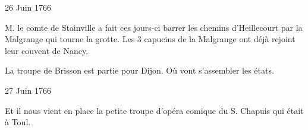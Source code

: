                      \begin{diary}{26 Juin 1766}{}
                        
                        
                           M. le comte de Stainville a fait
                           ces jours-ci
                           barrer les chemins
                              d'Heillecourt par la Malgrange
                           qui tourne la grotte. Les 3 capucins de
                           la Malgrange ont déjà
                           rejoint leur couvent
                           de Nancy. \bigskip
        
        
                         La troupe de Brisson est partie pour Dijon. Où vont s'assembler les états. \bigskip
        
        
                     \end{diary}

                     \begin{diary}{27 Juin 1766}{}
                        
                         Et il nous vient en place la petite
                           troupe
                           d'opéra comique du S.
                              Chapuis
                           qui était à Toul. \bigskip
        
        
                     \end{diary}

